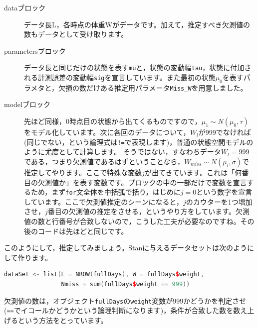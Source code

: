 \documentclass{ltjsbook}
\begin{document}
\begin{description}
	\item[dataブロック] データ長L，各時点の体重Wがデータです。加えて，推定すべき欠測値の数もデータとして受け取ります。
	\item[parametersブロック] データ長と同じだけの状態を表す\verb|mu|と，状態の変動幅\verb|tau|，状態に付加される計測誤差の変動幅\verb|sig|を宣言しています。また最初の状態$\mu_0$を表すパラメタと，欠損の数だけある推定用パラメータ\verb|Miss_W|を用意しました。
	\item[modelブロック] 先ほど同様，0時点目の状態から出てくるものですので，$\mu_1 \sim N(\mu_0,\tau)$をモデル化しています。次に各回のデータについて，$W_l$が999でなければ(同じでない，という論理式は\verb|!=|で表現します)，普通の状態空間モデルのように尤度として計算します。 そうではない，すなわちデータ$W_l=999$である，つまり欠測値であるはずということなら，$W_{miss} \sim N(\mu_l,\sigma)$で推定してやります。ここで特殊な変数$j$が出てきています。これは「何番目の欠測値か」を表す変数です。ブロックの中の一部だけで変数を宣言するため，まず\verb|for|文全体を中括弧で括り，はじめに$j=0$という数字を宣言しています。ここで欠測値推定のシーンになると，$j$のカウターを1つ増加させ，$j$番目の欠測値の推定をさせる，というやり方をしています。欠測値の数と行番号が合致しないので，こうした工夫が必要なのですね。その後のコードは先ほどと同じです。
\end{description}

このようにして，推定してみましょう。Stanに与えるデータセットは次のようにして作ります。
\begin{lstlisting}[language=c++,label={code:29_04},caption={Stanに与えるデータセット}]
dataSet <- list(L = NROW(fullDays), W = fullDays$weight, 
                Nmiss = sum(fullDays$weight == 999))
\end{lstlisting}
欠測値の数は，オブジェクト\verb|fullDays|の\verb|weight|変数が999かどうかを判定させ(\verb|==|でイコールかどうかという論理判断になります)，条件が合致した数を数え上げるという方法をとっています。
\end{document}
